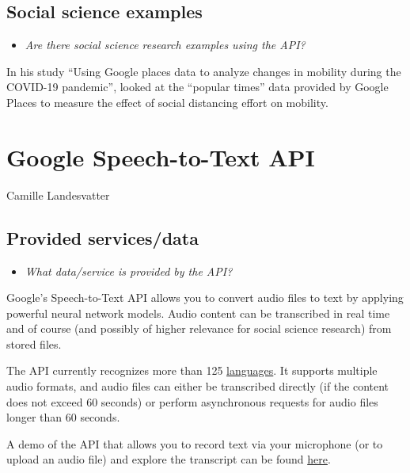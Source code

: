 \documentclass[
]{book}
\providecommand{\tightlist}{%
  \setlength{\itemsep}{0pt}\setlength{\parskip}{0pt}}
\begin{document}
\hypertarget{social-science-examples-3}{%
\section{Social science examples}\label{social-science-examples-3}}

\begin{itemize}
\tightlist
\item
  \emph{Are there social science research examples using the API?}
\end{itemize}

In his study ``Using Google places data to analyze changes in mobility during the COVID-19 pandemic'', \citet{Konrad2020-rl} looked at the ``popular times'' data provided by Google Places to measure the effect of social distancing effort on mobility.

\hypertarget{google-speech-to-text-api}{%
\chapter{Google Speech-to-Text API}\label{google-speech-to-text-api}}

Camille Landesvatter

\hypertarget{provided-servicesdata-4}{%
\section{Provided services/data}\label{provided-servicesdata-4}}

\begin{itemize}
\tightlist
\item
  \emph{What data/service is provided by the API?}
\end{itemize}

Google's Speech-to-Text API allows you to convert audio files to text by applying powerful neural network models. Audio content can be transcribed in real time and of course (and possibly of higher relevance for social science research) from stored files.

The API currently recognizes more than 125 \href{\%22https://cloud.google.com/speech-to-text/docs/languages\%22}{languages}. It supports multiple audio formats, and audio files can either be transcribed directly (if the content does not exceed 60 seconds) or perform asynchronous requests for audio files longer than 60 seconds.

A demo of the API that allows you to record text via your microphone (or to upload an audio file) and explore the transcript can be found \href{\%22https://cloud.google.com/speech-to-text\#section-2\%22}{here}.
\end{document}
